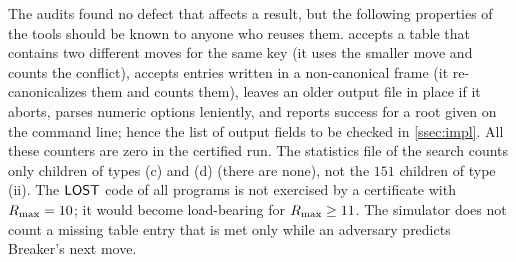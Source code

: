 The audits found no defect that affects a result, but the following properties of the tools should be
known to anyone who reuses them.  accepts a table that contains two different moves for the
same key (it uses the smaller move and counts the conflict), accepts entries written in a non-canonical
frame (it re-canonicalizes them and counts them), leaves an older output file in place if it aborts,
parses numeric options leniently, and reports success for a \VOID{} root given on the command line; hence
the list of output fields to be checked in \cref{ssec:impl}. All these counters are zero in the certified
run. The statistics file of the search counts only \VOID{} children of types (c) and (d) (there are none),
not the $151$ \VOID{} children of type (ii). The $\mathsf{LOST}$ code of all programs is not exercised by a
certificate with $R_{\max}=10$; it would become load-bearing for $R_{\max}\ge11$. The simulator does not count a
missing table entry that is met only while an adversary predicts Breaker's next move.
